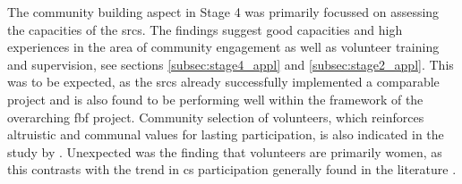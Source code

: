 The community building aspect in Stage 4 was primarily focussed on assessing the capacities of the \acrshort{srcs}. The findings suggest good capacities and high experiences in the area of community engagement as well as volunteer training and supervision, see sections \ref{subsec:stage4_appl} and \ref{subsec:stage2_appl}. This was to be expected, as the \acrshort{srcs} already successfully implemented a comparable project and is also found to be performing well within the framework of the overarching \acrshort{fbf} project. Community selection of volunteers, which reinforces altruistic and communal values for lasting participation, is also indicated in the study by \autocite{rotmanDynamicChangesMotivation2012}. Unexpected was the finding that volunteers are primarily women, as this contrasts with the trend in \acrshort{cs} participation generally found in the literature \autocite{ibrahimGenderImbalanceSpatiotemporal2021,patemanDiversityParticipantsEnvironmental2021}.

